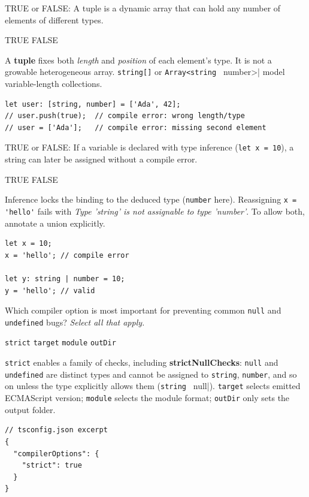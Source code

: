 \question[4]
TRUE or FALSE: A tuple is a dynamic array that can hold any number of elements of different types.
\begin{choices}
  \choice TRUE
  \CorrectChoice FALSE
\end{choices}
\begin{solution}
  A \textbf{tuple} fixes both \emph{length} and \emph{position} of each element's type. It is not a growable heterogeneous array. \lstinline[style=tsinline]|string[]| or \lstinline[style=tsinline]|Array<string | number>| model variable-length collections.
\begin{lstlisting}[style=ts]
let user: [string, number] = ['Ada', 42];
// user.push(true);  // compile error: wrong length/type
// user = ['Ada'];   // compile error: missing second element
\end{lstlisting}
\end{solution}




\newpage



\question[4]
TRUE or FALSE: If a variable is declared with type inference (\lstinline[style=tsinline]|let x = 10|), a string can later be assigned without a compile error.
\begin{choices}
  \choice TRUE
  \CorrectChoice FALSE
\end{choices}
\begin{solution}
  Inference locks the binding to the deduced type (\lstinline[style=tsinline]|number| here). Reassigning \lstinline[style=tsinline]|x = 'hello'| fails with \emph{Type 'string' is not assignable to type 'number'}. To allow both, annotate a union explicitly.
\begin{lstlisting}[style=ts]
let x = 10;
x = 'hello'; // compile error

let y: string | number = 10;
y = 'hello'; // valid
\end{lstlisting}
\end{solution}

\question[4]
Which compiler option is most important for preventing common \lstinline[style=tsinline]|null| and \lstinline[style=tsinline]|undefined| bugs? \emph{Select all that apply.}
\begin{checkboxes}
  \CorrectChoice \texttt{strict}
  \choice \texttt{target}
  \choice \texttt{module}
  \choice \texttt{outDir}
\end{checkboxes}
\begin{solution}
  \texttt{strict} enables a family of checks, including \textbf{strictNullChecks}: \lstinline[style=tsinline]|null| and \lstinline[style=tsinline]|undefined| are distinct types and cannot be assigned to \lstinline[style=tsinline]|string|, \lstinline[style=tsinline]|number|, and so on unless the type explicitly allows them (\lstinline[style=tsinline]|string | null|). \texttt{target} selects emitted ECMAScript version; \texttt{module} selects the module format; \texttt{outDir} only sets the output folder.
\begin{lstlisting}[style=ts]
// tsconfig.json excerpt
{
  "compilerOptions": {
    "strict": true
  }
}
\end{lstlisting}
\end{solution}

